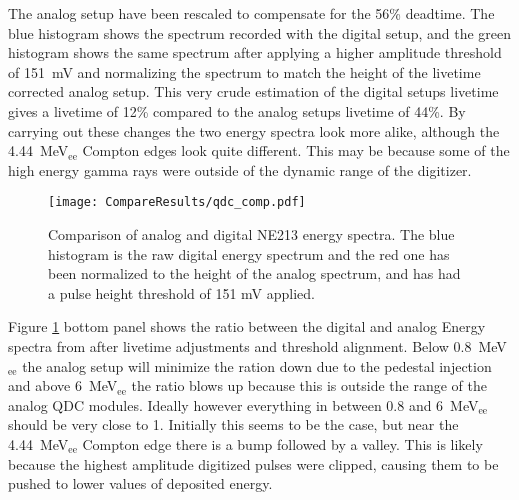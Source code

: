 \documentclass[main.tex]{subfiles}
\begin{document}
The analog setup have been rescaled to compensate for the 56\% deadtime. The blue histogram shows the spectrum recorded with the digital setup, and the green histogram shows the same spectrum after applying a higher amplitude threshold of \SI{151}{mV} and normalizing the spectrum to match the height of the livetime corrected analog setup. This very crude estimation of the digital setups livetime gives a livetime of 12\% compared to the analog setups livetime of 44\%. By carrying out these changes the two energy spectra look more alike, although the \SI{4.44}{\MeV}$_\text{ee}$ Compton edges look quite different. This may be because some of the high energy gamma rays were outside of the dynamic range of the digitizer.

\begin{figure}[h]
    \centering
        \texttt{[image: CompareResults/qdc\_comp.pdf]}
        \caption[Comparison of analog and digital NE213 energy spectra]{Comparison of analog and digital NE213 energy spectra. The blue histogram is the raw digital energy spectrum and the red one has been normalized to the height of the analog spectrum, and has had a pulse height threshold of 151 mV applied.}
    \label{fig:qdc_comp}
\end{figure}

Figure \ref{fig:qdc_comp} bottom panel shows the ratio between the digital and analog Energy spectra from after livetime adjustments and threshold alignment. Below \SI{0.8}{\MeV}$_\text{ee}$ the analog setup will minimize the ration down due to the pedestal injection and above \SI{6}{\MeV}$_\text{ee}$ the ratio blows up because this is outside the range of the analog QDC modules. Ideally however everything in between 0.8 and \SI{6}{\MeV}$_\text{ee}$ should be very close to 1. Initially this seems to be the case, but near the \SI{4.44}{\MeV}$_\text{ee}$ Compton edge there is a bump followed by a valley. This is likely because the highest amplitude digitized pulses were clipped, causing them to be pushed to lower values of deposited energy.
\end{document}
